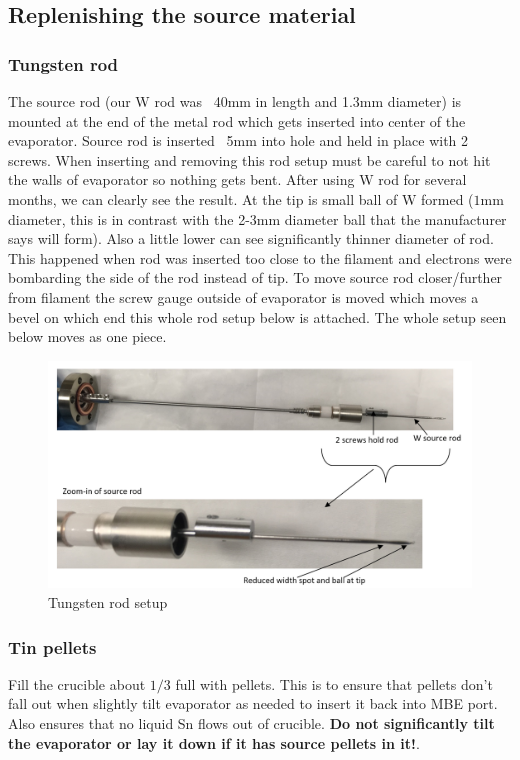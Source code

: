 \subsection{Replenishing the source material}
\subsubsection*{Tungsten rod}
The source rod (our W rod was ~40mm in length and 1.3mm diameter) is mounted at the end of the metal rod which gets inserted into center of the evaporator. Source rod is inserted ~5mm into hole and held in place with 2 screws. When inserting and removing this rod setup must be careful to not hit the walls of evaporator so nothing gets bent. After using W rod for several months, we can clearly see the result. At the tip is small ball of W formed ($1$mm diameter, this is in contrast with the 2-3mm diameter ball that the manufacturer says will form). Also a little lower can see significantly thinner diameter of rod. This happened when rod was inserted too close to the filament and electrons were bombarding the side of the rod instead of tip.  To move source rod closer/further from filament the screw gauge outside of evaporator is moved which moves a bevel on which end this whole rod setup below is attached. The whole setup seen below moves as one piece.

\begin{figure}[H]
	\centering
	\includegraphics[width=1\textwidth]{W-rod-pics.png}  %
	\caption{Tungsten rod setup}
	\label{fig:W-evaporator}
\end{figure}


\subsubsection*{Tin pellets}
Fill the crucible about $1/3$ full with pellets. This is to ensure that pellets don't fall out when slightly tilt evaporator as needed to insert it back into MBE port. Also ensures that no liquid Sn flows out of crucible. \textbf{Do not significantly tilt the evaporator or lay it down if it has source pellets in it!}.
 
